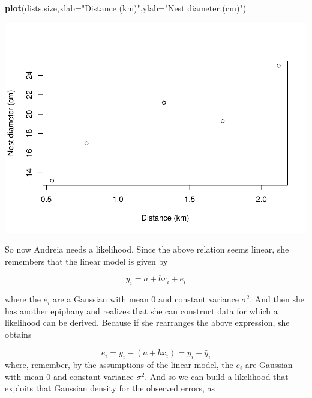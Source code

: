 \documentclass[
]{book}
\newenvironment{Shaded}{\begin{snugshade}}{\end{snugshade}}
\newcommand{\AttributeTok}[1]{\textcolor[rgb]{0.13,0.29,0.53}{#1}}
\newcommand{\CommentTok}[1]{\textcolor[rgb]{0.56,0.35,0.01}{\textit{#1}}}
\newcommand{\ControlFlowTok}[1]{\textcolor[rgb]{0.13,0.29,0.53}{\textbf{#1}}}
\newcommand{\DecValTok}[1]{\textcolor[rgb]{0.00,0.00,0.81}{#1}}
\newcommand{\FunctionTok}[1]{\textcolor[rgb]{0.13,0.29,0.53}{\textbf{#1}}}
\newcommand{\NormalTok}[1]{#1}
\newcommand{\OtherTok}[1]{\textcolor[rgb]{0.56,0.35,0.01}{#1}}
\newcommand{\SpecialCharTok}[1]{\textcolor[rgb]{0.81,0.36,0.00}{\textbf{#1}}}
\newcommand{\StringTok}[1]{\textcolor[rgb]{0.31,0.60,0.02}{#1}}
\begin{document}
\begin{Shaded}
\begin{Highlighting}[]
\FunctionTok{plot}\NormalTok{(dists,size,}\AttributeTok{xlab=}\StringTok{"Distance (km)"}\NormalTok{,}\AttributeTok{ylab=}\StringTok{"Nest diameter (cm)"}\NormalTok{)}
\end{Highlighting}
\end{Shaded}

\includegraphics{ECOMODbook_files/figure-latex/ch13.26-1.pdf}

So now Andreia needs a likelihood. Since the above relation seems linear, she remembers that the linear model is given by

\[y_i=a+b x_i+e_i\]

where the \(e_i\) are a Gaussian with mean 0 and constant variance \(\sigma^2\). And then she has another epiphany and realizes that she can construct data for which a likelihood can be derived. Because if she rearranges the above expression, she obtains

\[e_i=y_i-(a+b x_i)=y_i-\hat y_i\]
where, remember, by the assumptions of the linear model, the \(e_i\) are Gaussian with mean 0 and constant variance \(\sigma^2\). And so we can build a likelihood that exploits that Gaussian density for the observed errors, as

\begin{Shaded}
\end{Shaded}
\end{document}
